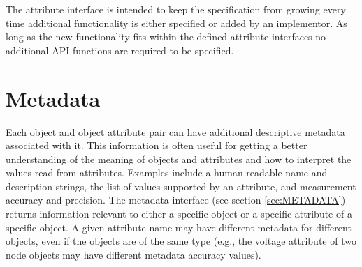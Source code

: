 The attribute interface is intended to keep the specification from growing every time additional functionality is either specified or added by an implementor. 
As long as the new functionality fits within the defined attribute interfaces no additional API functions are required to be specified.

\section{Metadata}\label{sec:TheoryMetadata}
Each object and object attribute pair can have additional descriptive metadata associated with it.
This information is often useful for getting a better understanding of the meaning of objects and attributes and how to interpret the values read from attributes.
Examples include a human readable name and description strings, the list of values supported by an attribute, and measurement accuracy and precision.
The metadata interface (see section \ref{sec:METADATA}) returns information relevant to either a specific object or a specific attribute of a specific object.
A given attribute name may have different metadata for different objects, even if the objects are of the same type (e.g., the voltage attribute of two node objects may have different metadata accuracy values).


